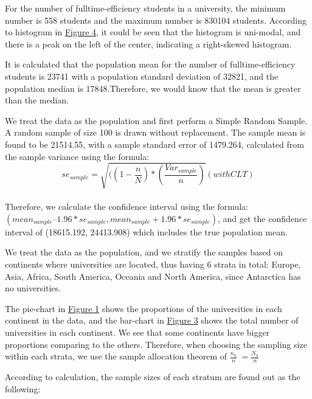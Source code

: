 \documentclass{article}
\begin{document}
For the number of fulltime-efficiency students in a university, the minimum number is 558 students and the maximum number is 830104 students. According to histogram in {\hyperref[fig:test4]{Figure 4}}, it could be seen that the histogram is uni-modal, and there is a peak on the left of the center, indicating a right-skewed histogram.

It is calculated that the population mean for the number of fulltime-efficiency students is 23741 with a population standard deviation of 32821, and the population median is 17848.Therefore, we would know that the mean is greater than the median.\\


We treat the data as the population and first perform a Simple Random Sample. A random sample of size 100 is drawn without replacement.
The sample mean is found to be 21514.55, with a sample standard error of 1479.264, calculated from the sample variance using the formula:
$$se_{sample} = \sqrt{((1 - \frac{n}{N}) * (\frac{Var_{sample}}{n})} (with CLT)$$\\
Therefore, we calculate the confidence interval using the formula:\\
$(mean_{sample} – 1.96*se_{sample}, mean_{sample} + 1.96*se_{sample})$, and get the confidence interval of (18615.192, 24413.908) which includes the true population mean.


We treat the data as the population, and we stratify the samples based on continents where universities are located, thus having 6 strata in total: Europe, Asia, Africa, South America, Oceania and North America, since Antarctica has no universities.
  
  The pie-chart in {\hyperref[fig:test1]{Figure 1}}
   shows the proportions of the universities in each continent in the data, and the bar-chart in {\hyperref[fig:test3]{Figure 3}} shows the total number of universities in each continent. We see that some continents have bigger proportions comparing to the others. Therefore, when choosing the sampling size within each strata, we use the sample allocation theorem of $ \frac{n_h}{n}\ = \frac{N_h}{n}\ $

According to calculation, the sample sizes of each stratum are found out as the following:
\end{document}
